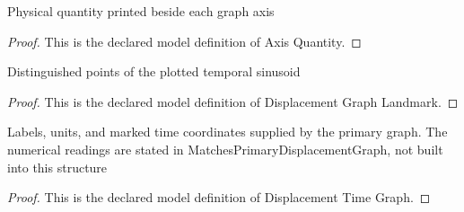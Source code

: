 \begin{definition}
  \label{def:physics:phyx-mini-0296:phyxminiproblems-problemphyxmini0296-axisquantity}
  Physical quantity printed beside each graph axis
\end{definition}
\begin{proof}
  This is the declared model definition of Axis Quantity.
\end{proof}
\begin{definition}
  \label{def:physics:phyx-mini-0296:phyxminiproblems-problemphyxmini0296-displacementgraphlandmark}
  Distinguished points of the plotted temporal sinusoid
\end{definition}
\begin{proof}
  This is the declared model definition of Displacement Graph Landmark.
\end{proof}
\begin{definition}
  \label{def:physics:phyx-mini-0296:phyxminiproblems-problemphyxmini0296-displacementtimegraph}
  Labels, units, and marked time coordinates supplied by the primary graph. The numerical readings are stated in MatchesPrimaryDisplacementGraph, not built into this structure
\end{definition}
\begin{proof}
  This is the declared model definition of Displacement Time Graph.
\end{proof}
